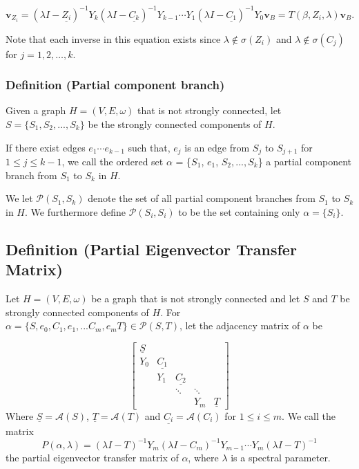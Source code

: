 \documentclass{paper}
\begin{document}
\[
\mathbf{v}_{Z_i} = (\lambda I - \underline{Z_i})^{-1} Y_k (\lambda I - \underline{C_{k}})^{-1} Y_{k-1} \cdots Y_{1}(\lambda I - \underline{C_{1}})^{-1}Y_{0}\mathbf{v}_{B} 
= T(\beta,Z_i,\lambda) \mathbf{v}_{B}.
\]

Note that each inverse in this equation exists since $\lambda\notin\sigma(Z_i)$ and $\lambda\notin\sigma(C_j)$ for $j=1,2,\dots,k$.

\subsubsection*{Definition (Partial component branch)}

Given a graph $H = (V,E,\omega)$ that is not strongly connected, let $S = \{S_1, S_2,...,S_k\}$ be the strongly connected components of $H$. 

If there exist edges $e_1 \cdots e_{k-1}$  such that, $e_j$ is an edge from $S_j$ to $S_{j+1}$ for $1 \leq j \leq k-1$, we call the ordered set $\alpha$ = \{$S_1$, $e_1$, $S_2,...,S_k$\} a partial component branch from $S_1$ to $S_k$ in $H$. 

We let $\mathcal{P}(S_1,S_k)$ denote the set of all partial component branches from $S_1$ to $S_k$ in $H$. We furthermore define $\mathcal{P}(S_i,S_i)$ to be the set containing only $\alpha=\{S_i\}$.


\subsection*{Definition (Partial Eigenvector Transfer Matrix)}
Let $H = (V,E,\omega)$ be a graph that is not strongly connected and let $S$ and $T$ be strongly connected components of $H$. For $\alpha = \{S, e_0, C_1, e_1, ... C_m, e_m  T \} \in \mathcal{P}(S,T)$, let the adjacency matrix of $\alpha$ be

\[
\begin{bmatrix}
\underline{S} \\
Y_0 & \underline{C_1} \\
    & Y_1 & \underline{C_2} \\
    &     & \ddots & \ddots \\
    &	  & 		   & Y_m & \underline{T}
\end{bmatrix}
\]
Where $\underline{S} = \mathcal{A}(S)$, $\underline{T} = \mathcal{A}(T)$ and $\underline{C_i} = \mathcal{A}(C_i)$ for $1 \leq i \leq m$. We call the matrix 
\[
P(\alpha,\lambda) = (\lambda I - T)^{-1}Y_m (\lambda I - C_m)^{-1}Y_{m-1} \cdots Y_m (\lambda I - T)^{-1}\]
 the partial eigenvector transfer matrix of $\alpha$, where $\lambda$ is a spectral parameter.
\end{document}
